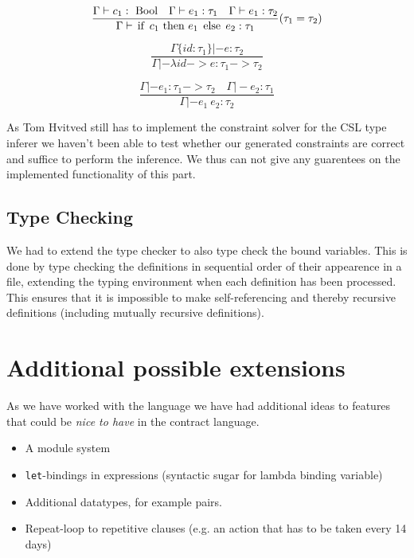 \documentclass[10pt,a4paper,final,oneside,openany,article]{memoir}
\newcommand{\kw}[1]{\text{\lstinline{#1}}}
\begin{document}
\begin{equation*}
\frac{
  \Gamma |- c_1 : ~\kw{Bool}
  \quad \Gamma |- e_1 : \tau_1
  \quad \Gamma |- e_1 : \tau_2
}{
  \Gamma |- \kw{if}~ c_1 ~\kw{then}~ e_1 ~\kw{else}~ e_2 : \tau_1
}(\tau_1=\tau_2)\label{eq:type_cond}
\end{equation*}

\begin{equation*}
\frac{
  \Gamma\{id : \tau_1\} |- e : \tau_2
}{
  \Gamma |- \lambda id -> e : \tau_1 -> \tau_2
}\label{eq:type_lambda}
\end{equation*}

\begin{equation*}
\frac{
  \Gamma |- e_1 : \tau_1 -> \tau_2
  \quad \Gamma |- e_2 : \tau_1
}{
  \Gamma |- e_1~ e_2 : \tau_2
}\label{eq:type_apply}
\end{equation*}

As Tom Hvitved still has to implement the constraint solver for the
CSL type inferer we haven't been able to test whether our generated
constraints are correct and suffice to perform the inference. We thus
can not give any guarentees on the implemented functionality of this part.


\section{Type Checking}
We had to extend the type checker to also type check the bound
variables. This is done by type checking the definitions in sequential
order of their appearence in a file, extending the typing environment
when each definition has been processed. This ensures that it is
impossible to make self-referencing and thereby recursive definitions
(including mutually recursive definitions).

\chapter{Additional possible extensions}
As we have worked with the language we have had additional ideas to
features that could be \textit{nice to have} in the contract language.

\begin{itemize}
\item A module system
\item \lstinline{let}-bindings in expressions (syntactic sugar for
  lambda binding variable)
\item Additional datatypes, for example pairs.
\item Repeat-loop to repetitive clauses (e.g. an action that has to be
  taken every 14 days)
\end{itemize}
\end{document}

